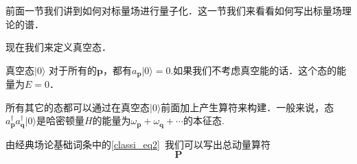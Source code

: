 
前面一节我们讲到如何对标量场进行量子化．这一节我们来看看如何写出标量场理论的谱．

现在我们来定义真空态．
\begin{definition}{真空态$|0\rangle$}
对于所有的$\mathbf p$，都有$a_{\mathbf p}|0\rangle=0$.如果我们不考虑真空能的话．这个态的能量为$E=0$．
\end{definition}
所有其它的态都可以通过在真空态$|0\rangle$前面加上产生算符来构建．一般来说，态$a^\dagger_{\mathbf p}a^\dagger_{\mathbf q}|0\rangle$是哈密顿量$H$的能量为$\omega_{\mathbf p}+\omega_{\mathbf q}+\cdots$的本征态.

由经典场论基础词条中的\autoref{classi_eq2}~我们可以写出总动量算符
\begin{equation}
\mathbf P
\end{equation}




